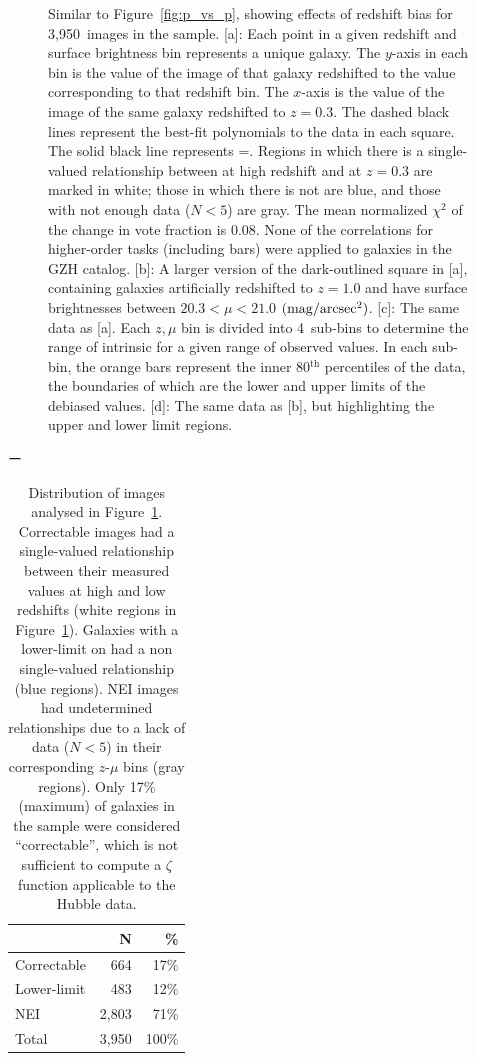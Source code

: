 \documentclass[twocolumn]{aastex6}
\begin{document}
\begin{figure}
\caption{Similar to Figure~\ref{fig:p_vs_p}, showing effects of redshift bias for 3,950~images in the \ferengi{} sample. [a]: Each point in a given redshift and surface brightness bin represents a unique galaxy. The $y$-axis in each bin is the \pfeatures{} value of the image of that galaxy redshifted to the value corresponding to that redshift bin. The $x$-axis is the \pfeatures{} value of the image of the same galaxy redshifted to $z=0.3$. The dashed black lines represent the best-fit polynomials to the data in each square. The solid black line represents \pfeaturesz=\pfeaturesrest. Regions in which there is a single-valued relationship between \pfeatures{} at high redshift and at $z=0.3$ are marked in white; those in which there is not are blue, and those with not enough data ($N<5$) are gray. The mean normalized $\chi^2$ of the change in vote fraction is 0.08. None of the correlations for higher-order tasks (including bars) were applied to galaxies in the GZH catalog. [b]: A larger version of the dark-outlined square in [a], containing \ferengi{} galaxies artificially redshifted to $z=1.0$ and have surface brightnesses between $20.3 < \mu < 21.0$ $\rm (mag/arcsec^2)$. [c]: The same data as [a]. Each $z,\mu$ bin is divided into 4~sub-bins to determine the range of intrinsic \pfeaturesrest{} for a given range of observed \pfeaturesz{} values. In each sub-bin, the orange bars represent the inner 80$^\mathrm{th}$ percentiles of the data, the boundaries of which are the lower and upper limits of the debiased values. [d]: The same data as [b], but highlighting the upper and lower limit regions.}
\label{fig:p_vs_p_bar}
\end{figure}

\begin{table}ー
\label{tbl:ferengi_bar}
\caption{Distribution of \ferengi{} images analysed in Figure~\ref{fig:p_vs_p_bar}. Correctable images had a single-valued relationship between their measured \pbar{} values at high and low redshifts (white regions in Figure~\ref{fig:p_vs_p_bar}). Galaxies with a lower-limit on \pbar{} had a non single-valued relationship (blue regions). NEI images had undetermined relationships due to a lack of data ($N<5$) in their corresponding $z$-$\mu$ bins (gray regions). Only 17\% (maximum) of \ferengi{} galaxies in the sample were considered ``correctable'', which is not sufficient to compute a $\zeta$ function applicable to the Hubble data.   \label{tbl:ferengi_bar_corrections}}
\begin{tabular}{lrr}
\hline \hline
				                   & N       & \% \\
\hline 
Correctable                        & 664   & 17\% \\
Lower-limit                        & 483   & 12\% \\
NEI                                & 2,803     & 71\%\\
Total                              & 3,950   & 100\% \\
\hline \hline
\end{tabular}
\end{table}
\end{document}
